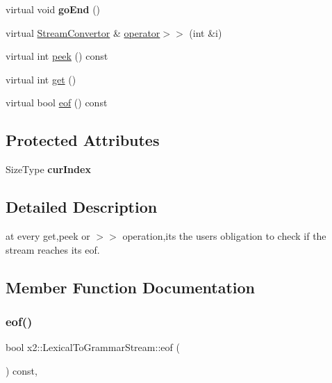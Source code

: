 \begin{DoxyCompactItemize}
virtual void {\bfseries go\+End} ()
\item 
virtual \hyperlink{classx2_1_1_stream_convertor}{Stream\+Convertor} \& \hyperlink{classx2_1_1_lexical_to_grammar_stream_a7b3d4b7bfc44a17905bae8dc8dcf7a40}{operator$>$$>$} (int \&i)
\item 
virtual int \hyperlink{classx2_1_1_lexical_to_grammar_stream_a67a0e2b6ed998fd1dea1c9829be4461f}{peek} () const
\item 
virtual int \hyperlink{classx2_1_1_lexical_to_grammar_stream_a8ae8e1b6ada26785c70db1255daca798}{get} ()
\item 
virtual bool \hyperlink{classx2_1_1_lexical_to_grammar_stream_a813ec919763970d4150f35cba4da1db1}{eof} () const
\end{DoxyCompactItemize}
\subsection*{Protected Attributes}
\begin{DoxyCompactItemize}
\item 
\mbox{\label{classx2_1_1_lexical_to_grammar_stream_a7691e61d5ed3c843e1011f7733fab0c7}} 
Size\+Type {\bfseries cur\+Index}
\end{DoxyCompactItemize}


\subsection{Detailed Description}
at every get,peek or $>$$>$ operation,it\textquotesingle{}s the user\textquotesingle{}s obligation to check if the stream reaches its eof. 

\subsection{Member Function Documentation}
\mbox{\label{classx2_1_1_lexical_to_grammar_stream_a813ec919763970d4150f35cba4da1db1}} 
\subsubsection{\texorpdfstring{eof()}{eof()}}
{\footnotesize\ttfamily bool x2\+::\+Lexical\+To\+Grammar\+Stream\+::eof (\begin{DoxyParamCaption}{ }\end{DoxyParamCaption}) const\hspace{0.3cm}{\ttfamily [inline]}, {\ttfamily [virtual]}}

